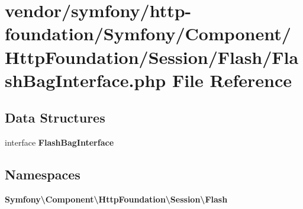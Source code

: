\section{vendor/symfony/http-\/foundation/\+Symfony/\+Component/\+Http\+Foundation/\+Session/\+Flash/\+Flash\+Bag\+Interface.php File Reference}
\label{_flash_bag_interface_8php}
\subsection*{Data Structures}
\begin{DoxyCompactItemize}
\item 
interface {\bf Flash\+Bag\+Interface}
\end{DoxyCompactItemize}
\subsection*{Namespaces}
\begin{DoxyCompactItemize}
\item 
 {\bf Symfony\textbackslash{}\+Component\textbackslash{}\+Http\+Foundation\textbackslash{}\+Session\textbackslash{}\+Flash}
\end{DoxyCompactItemize}
